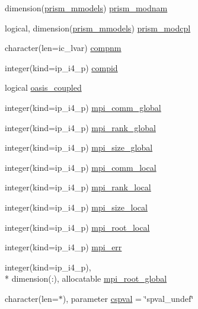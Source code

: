 \begin{DoxyCompactItemize}
dimension(\hyperlink{classmod__oasis__data_a11c61975c048981f7e508f1b6caf16b6}{prism\+\_\+mmodels}) \hyperlink{classmod__oasis__data_abd4b98e9f321bc073d5a8e0292ba7131}{prism\+\_\+modnam}
\item 
logical, dimension(\hyperlink{classmod__oasis__data_a11c61975c048981f7e508f1b6caf16b6}{prism\+\_\+mmodels}) \hyperlink{classmod__oasis__data_ad5282716e60cbe5e8c1ced7758fc9ae1}{prism\+\_\+modcpl}
\item 
character(len=ic\+\_\+lvar) \hyperlink{classmod__oasis__data_a8379835615758ccf7a4287dde5785681}{compnm}
\item 
integer(kind=ip\+\_\+i4\+\_\+p) \hyperlink{classmod__oasis__data_ab53c9f7676f84fdf1050cea5efcd3e7f}{compid}
\item 
logical \hyperlink{classmod__oasis__data_a5056590b195dc981725173c79e52de3b}{oasis\+\_\+coupled}
\item 
integer(kind=ip\+\_\+i4\+\_\+p) \hyperlink{classmod__oasis__data_a4bbff51054fd1746849de9defb3d5252}{mpi\+\_\+comm\+\_\+global}
\item 
integer(kind=ip\+\_\+i4\+\_\+p) \hyperlink{classmod__oasis__data_af9bb2a4f321e7d7750e90c01022828fe}{mpi\+\_\+rank\+\_\+global}
\item 
integer(kind=ip\+\_\+i4\+\_\+p) \hyperlink{classmod__oasis__data_a83a9d498c6829e2058675a07446ce5be}{mpi\+\_\+size\+\_\+global}
\item 
integer(kind=ip\+\_\+i4\+\_\+p) \hyperlink{classmod__oasis__data_acd8801d4fab87a19c6f4f69a661d56c5}{mpi\+\_\+comm\+\_\+local}
\item 
integer(kind=ip\+\_\+i4\+\_\+p) \hyperlink{classmod__oasis__data_a811747a1592795f860854f09f19d4c25}{mpi\+\_\+rank\+\_\+local}
\item 
integer(kind=ip\+\_\+i4\+\_\+p) \hyperlink{classmod__oasis__data_a617f69fb4d4bb96a94f83a124b4d0030}{mpi\+\_\+size\+\_\+local}
\item 
integer(kind=ip\+\_\+i4\+\_\+p) \hyperlink{classmod__oasis__data_a2c468f26bc0c9b2ad5d54d68733e7047}{mpi\+\_\+root\+\_\+local}
\item 
integer(kind=ip\+\_\+i4\+\_\+p) \hyperlink{classmod__oasis__data_abd48a08a17f07ec656912d9b2b7b7922}{mpi\+\_\+err}
\item 
integer(kind=ip\+\_\+i4\+\_\+p), \\*
dimension(\+:), allocatable \hyperlink{classmod__oasis__data_a7f03d4afc0c91a42b13ddcf7ec082e51}{mpi\+\_\+root\+\_\+global}
\item 
character(len=$\ast$), parameter \hyperlink{classmod__oasis__data_acfb160b3d147e7cb667b0dc0f5bb2960}{cspval} = \char`\"{}spval\+\_\+undef\char`\"{}

\end{DoxyCompactItemize}
